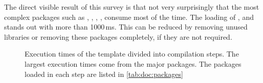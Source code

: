 The direct visible result of this survey is that not very surprisingly that the most complex packages such as , , , ,  consume most of the time. The loading of ,  and  stands out with more than 1000\,ms. This can be reduced by removing unused libraries or removing these packages completely, if they are not required.

%
\begin{figure}[p]

\caption{Execution times of the template divided into compilation steps. The largest execution times come from the major packages. The packages loaded in each step are listed in \cref{tab:doc:packages}}
\label{fig:doc:executiontimes}
\end{figure}


